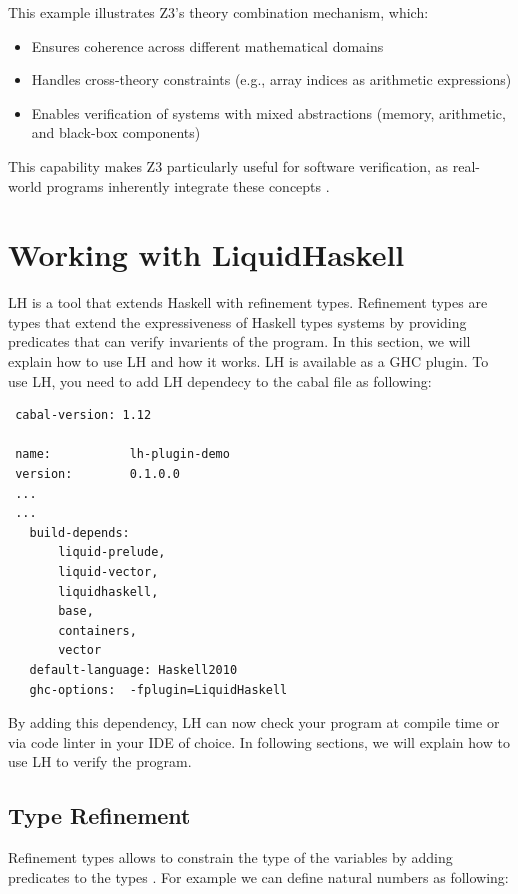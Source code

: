 \documentclass[]{rptuseminar}
\begin{document}
This example illustrates Z3's theory combination mechanism, which:
\begin{itemize}
    \item Ensures coherence across different mathematical domains
    \item Handles cross-theory constraints (e.g., array indices as arithmetic expressions)
    \item Enables verification of systems with mixed abstractions (memory, arithmetic, and black-box components)
\end{itemize}

This capability makes Z3 particularly useful for software verification, as real-world programs inherently integrate these concepts \cite{nikolaj_bjorner_programming_nodate}.
\section{Working with LiquidHaskell}
\label{sec:lh}
LH is a tool that extends Haskell with refinement types. Refinement types are types that extend the expressiveness of Haskell types systems by providing predicates that can verify invarients of the program. In this section, we will explain how to use LH and how it works.
LH is available as a GHC plugin. To use LH, you need to add LH dependecy to the cabal file as following:

\vspace{1em}
\begin{lstlisting}
 cabal-version: 1.12

 name:           lh-plugin-demo
 version:        0.1.0.0
 ...
 ...
   build-depends:
       liquid-prelude,
       liquid-vector,
       liquidhaskell,
       base,
       containers,
       vector
   default-language: Haskell2010
   ghc-options:  -fplugin=LiquidHaskell
\end{lstlisting}
\vspace{1em}

By adding this dependency, LH can now check your program at compile time or via code linter in your IDE of choice. In following sections, we will explain how to use LH to verify the program.
\subsection{Type Refinement}
Refinement types allows to constrain the type of the variables by adding predicates to the types \cite{jhala_programming_2020}. For example we can define natural numbers as following:
\end{document}
